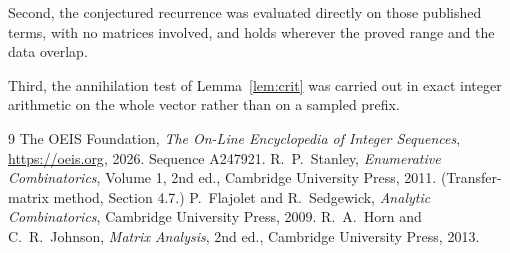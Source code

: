 \documentclass[11pt,a4paper]{article}
\theoremstyle{plain}
\theoremstyle{definition}
\begin{document}
Second, the conjectured recurrence was evaluated directly on those published terms, with no
matrices involved, and holds wherever the proved range and the data overlap.

Third, the annihilation test of Lemma~\ref{lem:crit} was carried out in exact integer
arithmetic on the whole vector rather than on a sampled prefix.

\begin{thebibliography}{9}
 The OEIS Foundation, \emph{The On-Line Encyclopedia of Integer
Sequences}, \url{https://oeis.org}, 2026. Sequence A247921.
 R.~P.~Stanley, \emph{Enumerative Combinatorics}, Volume 1, 2nd ed.,
Cambridge University Press, 2011. (Transfer-matrix method, Section 4.7.)
 P.~Flajolet and R.~Sedgewick, \emph{Analytic Combinatorics}, Cambridge
University Press, 2009.
 R.~A.~Horn and C.~R.~Johnson, \emph{Matrix Analysis}, 2nd ed., Cambridge
University Press, 2013.
\end{thebibliography}
\end{document}
